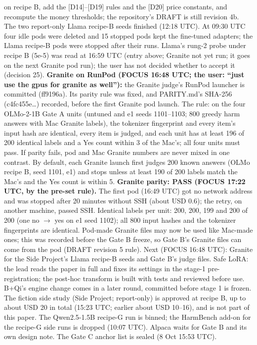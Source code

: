 \documentclass{article}
\theoremstyle{plain}
\theoremstyle{definition}
\theoremstyle{remark}
\begin{document}
\begin{itemize}
        on recipe B, add the [D14]--[D19] rules and the [D20] price constants,
        and recompute the money thresholds; the repository's DRAFT is still
        revision 4b. The two report-only Llama recipe-B seeds finished (12:18
        UTC). At 09:30 UTC four idle pods were deleted and 15 stopped pods kept
        the fine-tuned adapters; the Llama recipe-B pods were stopped after
        their runs. Llama's rung-2 probe under recipe B (5e-5) was read at 16:59
        UTC (entry above; Granite not yet run; it goes on the next Granite pod
        run); the user has not decided whether to accept it (decision 25).
        \textbf{Granite on RunPod (FOCUS 16:48 UTC; the user: ``just use the
        gpus for granite as well''):} the Granite judge's RunPod launcher is
        committed (ff9196a). Its parity rule was fixed, and PARITY.md's SHA-256
        (c4fc455e\ldots{}) recorded, before the first Granite pod launch. The
        rule: on the four OLMo-2-1B Gate A units (untuned and e1 seeds
        1101--1103; 800 greedy harm answers with Mac Granite labels), the
        tokenizer fingerprint and every item's input hash are identical, every
        item is judged, and each unit has at least 196 of 200 identical labels
        and a Yes count within 3 of the Mac's; all four units must pass. If
        parity fails, pod and Mac Granite numbers are never mixed in one
        contrast. By default, each Granite launch first judges 200 known answers
        (OLMo recipe B, seed 1101, e1) and stops unless at least 190 of 200
        labels match the Mac's and the Yes count is within 5. \textbf{Granite
        parity: PASS (FOCUS 17:22 UTC, by the pre-set rule).} The first pod
        (16:49 UTC) got no network address and was stopped after 20 minutes
        without SSH (about USD 0.6); the retry, on another machine, passed SSH.
        Identical labels per unit: 200, 200, 199 and 200 of 200 (one no $\to$
        yes on e1 seed 1102); all 800 input hashes and the tokenizer
        fingerprints are identical. Pod-made Granite files may now be used like
        Mac-made ones; this was recorded before the Gate B freeze, so Gate B's
        Granite files can come from the pod (DRAFT revision 5 rule). Next (FOCUS
        16:48 UTC): Granite for the Side Project's Llama recipe-B seeds and Gate
        B's judge files. Safe LoRA: the lead reads the paper in full and fixes
        its settings in the stage-1 pre-registration; the post-hoc transform is
        built with tests and reviewed before use. B+Qi's engine change comes in
        a later round, committed before stage 1 is frozen. The fiction side
        study (Side Project; report-only) is approved at recipe B, up to about
        USD 20 in total (15:23 UTC; earlier about USD 10--16), and is not part
        of this paper. The Qwen2.5-1.5B recipe-G run is binned; the HarmBench
        add-on for the recipe-G side runs is dropped (10:07 UTC). Alpaca waits
        for Gate B and its own design note. The Gate C anchor list is sealed (8
        Oct 15:53 UTC).
\end{itemize}
\end{document}

